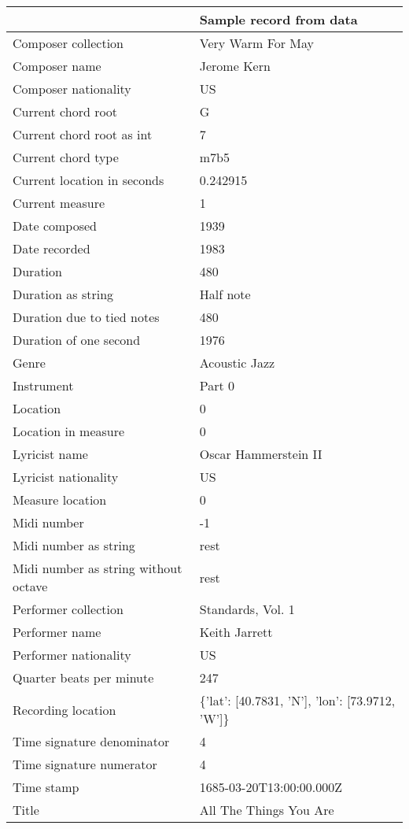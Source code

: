 \documentclass[11pt]{article}
\begin{document}
    \begin{tabular}{ll}
\toprule
{} &                         Sample record from data \\
\midrule
Composer collection                  &  Very Warm For May \\
Composer name                        &  Jerome Kern \\
Composer nationality                 &  US \\
Current chord root                   &  G \\
Current chord root as int            &  7 \\
Current chord type                   &  m7b5 \\
Current location in seconds          &  0.242915 \\
Current measure                      &  1 \\
Date composed                        &  1939 \\
Date recorded                        &  1983 \\
Duration                             &  480 \\
Duration as string                   &  Half note \\
Duration due to tied notes           &  480 \\
Duration of one second               &  1976 \\
Genre                                &  Acoustic Jazz \\
Instrument                           &  Part 0 \\
Location                             &  0 \\
Location in measure                  &  0 \\
Lyricist name                        &  Oscar Hammerstein II \\
Lyricist nationality                 &  US \\
Measure location                     &  0 \\
Midi number                          &  -1 \\
Midi number as string                &  rest \\
Midi number as string without octave &  rest \\
Performer collection                 &  Standards, Vol. 1 \\
Performer name                       &  Keith Jarrett \\
Performer nationality                &  US \\
Quarter beats per minute             &  247 \\
Recording location                   &  \{'lat': [40.7831, 'N'], 'lon': [73.9712, 'W']\} \\
Time signature denominator           &  4 \\
Time signature numerator             &  4 \\
Time stamp                           &  1685-03-20T13:00:00.000Z \\
Title                                &  All The Things You Are \\
\bottomrule
\end{tabular}
\end{document}
